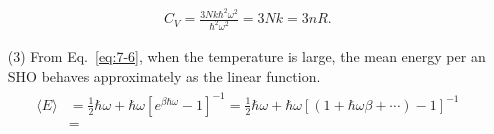 \documentclass[floatfix,nofootinbib,superscriptaddress,fleqn]{revtex4-2}
\begin{document}
\begin{itemize}
\begin{align}
    C_V = \frac{3Nk\hbar^2\omega^2}
    {\hbar^2\omega^2}=3Nk = 3nR.
  \end{align}
  \item[(3)] From Eq.~\eqref{eq:7-6}, when the temperature is large,
  the mean energy per an SHO behaves approximately as the linear function.
   \begin{align}
    \begin{split}
      \langle E\rangle &= \frac{1}{2}\hbar\omega 
      + \hbar\omega\left[e^{\beta\hbar\omega}-1\right]^{-1}
      =\frac{1}{2}\hbar\omega 
      + \hbar\omega\left[(1+\hbar\omega\beta+\cdots)-1\right]^{-1}  \\
      &= 
    \end{split}
   \end{align} 

\end{itemize}
\end{document}
